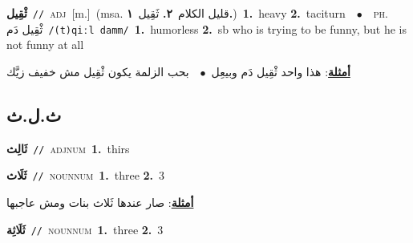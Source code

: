 \documentclass[10pt,a4paper,twoside]{article} %
\begin{document}
\begin{multicols}{2}
{\setlength\topsep{0pt}\textbf{\foreignlanguage{arabic}{ثْقِيل}}\ {\color{gray}\texttt{//}\color{black}}\ \textsc{adj}\ [m.]\ \color{gray}(msa. \foreignlanguage{arabic}{قليل الكلام}~\foreignlanguage{arabic}{\textbf{٢.}}  \foreignlanguage{arabic}{ثَقِيل}~\foreignlanguage{arabic}{\textbf{١.}})\color{black}\ \textbf{1.}~heavy  \textbf{2.}~taciturn\ \ $\bullet$\ \ \textsc{ph.} \color{gray} \foreignlanguage{arabic}{ثْقِيل دَم}\color{black}\ {\color{gray}\texttt{/{\sffamily (t)qiːl damm}/}\color{black}}\ \textbf{1.}~humorless  \textbf{2.}~sb who is trying to be funny, but he is not funny at all\  \begin{flushright}\color{gray}\foreignlanguage{arabic}{\textbf{\underline{\foreignlanguage{arabic}{أمثلة}}}: هذا واحد ثْقِيل دَم وبيعِل\ $\bullet$\ \  بحب الزلمة يكون ثْقِيل مش خفيف زيَّك}\end{flushright}\color{black}} \vspace{2mm}

\vspace{-3mm}
\subsection*{\color{blue}\foreignlanguage{arabic}{ث.ل.ث}\color{blue}{}} 

{\setlength\topsep{0pt}\textbf{\foreignlanguage{arabic}{ثَالِث}}\ {\color{gray}\texttt{//}\color{black}}\ \textsc{adj\textunderscore num}\ \textbf{1.}~thirs\ } \vspace{2mm}

{\setlength\topsep{0pt}\textbf{\foreignlanguage{arabic}{ثَلَاث}}\ {\color{gray}\texttt{//}\color{black}}\ \textsc{noun\textunderscore num}\ \textbf{1.}~three  \textbf{2.}~3\  \begin{flushright}\color{gray}\foreignlanguage{arabic}{\textbf{\underline{\foreignlanguage{arabic}{أمثلة}}}: صار عندها ثَلاث بنات ومش عاجبها}\end{flushright}\color{black}} \vspace{2mm}

{\setlength\topsep{0pt}\textbf{\foreignlanguage{arabic}{ثَلَاثِة}}\ {\color{gray}\texttt{//}\color{black}}\ \textsc{noun\textunderscore num}\ \textbf{1.}~three  \textbf{2.}~3\ } \vspace{2mm}


\end{multicols}
\end{document}
